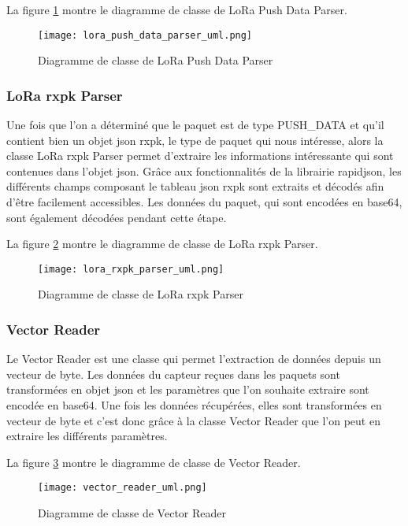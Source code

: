 La figure \ref{fig:lora_push_data_parser_uml} montre le diagramme de classe de LoRa Push Data Parser.

\begin{figure}[htb]
\centering 
\texttt{[image: lora\_push\_data\_parser\_uml.png]} 
\caption{Diagramme de classe de LoRa Push Data Parser}
\label{fig:lora_push_data_parser_uml}
 \end{figure}

\subsubsection{LoRa rxpk Parser}

Une fois que l'on a déterminé que le paquet est de type PUSH\_DATA et qu'il contient bien un objet json rxpk, le type de paquet qui nous intéresse, alors la classe LoRa rxpk Parser permet d'extraire les informations intéressante qui sont contenues dans l'objet json. Grâce aux fonctionnalités de la librairie rapidjson, les différents champs composant le tableau json rxpk sont extraits et décodés afin d'être facilement accessibles. Les données du paquet, qui sont encodées en base64, sont également décodées pendant cette étape.

La figure \ref{fig:lora_rxpk_parser_uml} montre le diagramme de classe de LoRa rxpk Parser.

\begin{figure}[htb]
\centering 
\texttt{[image: lora\_rxpk\_parser\_uml.png]} 
\caption{Diagramme de classe de LoRa rxpk Parser}
\label{fig:lora_rxpk_parser_uml}
 \end{figure}

\subsubsection{Vector Reader}

Le Vector Reader est une classe qui permet l'extraction de données depuis un vecteur de byte.  Les données du capteur reçues dans les paquets sont transformées en objet json et les paramètres que l'on souhaite extraire sont encodée en base64. Une fois les données récupérées, elles sont transformées en vecteur de byte et c'est donc grâce à la classe Vector Reader que l'on peut en extraire les différents paramètres.

La figure \ref{fig:vector_reader_uml} montre le diagramme de classe de Vector Reader.

\begin{figure}[htb]
\centering 
\texttt{[image: vector\_reader\_uml.png]} 
\caption{Diagramme de classe de Vector Reader}
\label{fig:vector_reader_uml}
 \end{figure}

